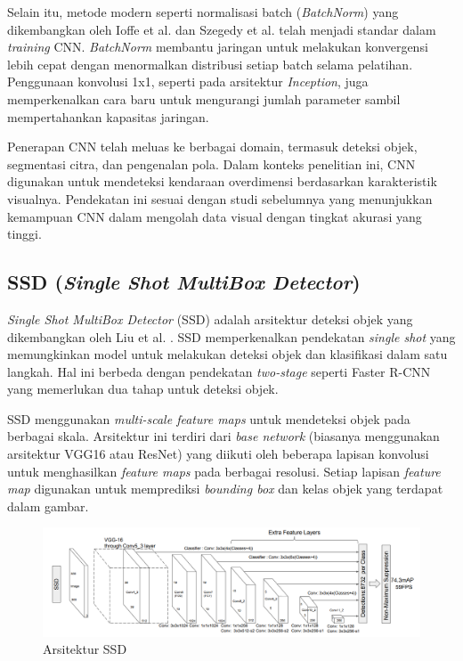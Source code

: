 Selain itu, metode modern seperti normalisasi batch (\emph{BatchNorm}) yang dikembangkan oleh Ioffe et al. \parencite*{ioffe2015} dan Szegedy et al. \parencite*{szegedy2015} telah menjadi standar dalam \emph{training} CNN. \emph{BatchNorm} membantu jaringan untuk melakukan konvergensi lebih cepat dengan menormalkan distribusi setiap batch selama pelatihan. Penggunaan konvolusi 1x1, seperti pada arsitektur \emph{Inception}, juga memperkenalkan cara baru untuk mengurangi jumlah parameter sambil mempertahankan kapasitas jaringan.
 
Penerapan CNN telah meluas ke berbagai domain, termasuk deteksi objek, segmentasi citra, dan pengenalan pola. Dalam konteks penelitian ini, CNN digunakan untuk mendeteksi kendaraan overdimensi berdasarkan karakteristik visualnya. Pendekatan ini sesuai dengan studi sebelumnya yang menunjukkan kemampuan CNN dalam mengolah data visual dengan tingkat akurasi yang tinggi.
\subsection{SSD (\emph{Single Shot MultiBox Detector})}

\emph{Single Shot MultiBox Detector} (SSD) adalah arsitektur deteksi objek yang dikembangkan oleh Liu et al. \parencite*{liu2016}. SSD memperkenalkan pendekatan \emph{single shot} yang memungkinkan model untuk melakukan deteksi objek dan klasifikasi dalam satu langkah. Hal ini berbeda dengan pendekatan \emph{two-stage} seperti Faster R-CNN yang memerlukan dua tahap untuk deteksi objek.

SSD menggunakan \emph{multi-scale feature maps} untuk mendeteksi objek pada berbagai skala. Arsitektur ini terdiri dari \emph{base network} (biasanya menggunakan arsitektur VGG16 atau ResNet) yang diikuti oleh beberapa lapisan konvolusi untuk menghasilkan \emph{feature maps} pada berbagai resolusi. Setiap lapisan \emph{feature map} digunakan untuk memprediksi \emph{bounding box} dan kelas objek yang terdapat dalam gambar.

\begin{figure}[H]
  \centering
  \includegraphics[scale=0.36]{gambar/bab2-arsitektur-ssd.png}
  \caption{Arsitektur SSD}
  \label{fig:arsitektur_ssd}
\end{figure}

